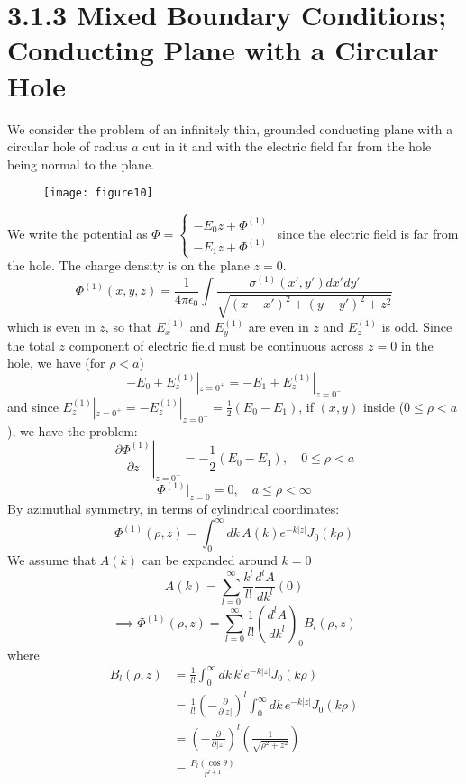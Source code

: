 \documentclass{article}
\begin{document}
	\section*{3.1.3 Mixed Boundary Conditions; Conducting Plane with a Circular Hole}
	
	We consider the problem of an infinitely thin, grounded conducting plane with a circular hole of radius $a$ cut in it and with the electric field far from the hole being normal to the plane.
	
	\begin{figure}[h]
		\centering
		\texttt{[image: figure10]}
		\caption{}
		\label{fig:figure10}
	\end{figure}
	
	We write the potential as $\Phi = \begin{cases} -E_0 z + \Phi^{(1)} \\ -E_1 z + \Phi^{(1)} \end{cases}$ since the electric field is far from the hole. The charge density is on the plane $z=0$.
	\[
	\Phi^{(1)}(x,y,z) = \frac{1}{4\pi\epsilon_0} \int \frac{\sigma^{(1)}(x',y')dx'dy'}{\sqrt{(x-x')^2 + (y-y')^2+z^2}}
	\]
	which is even in $z$, so that $E_x^{(1)}$ and $E_y^{(1)}$ are even in $z$ and $E_z^{(1)}$ is odd. Since the total $z$ component of electric field must be continuous across $z=0$ in the hole, we have (for $\rho<a$)
	\[
	-E_0 + E_z^{(1)}|_{z=0^+} = -E_1 + E_z^{(1)}|_{z=0^-}
	\]
	and since $E_z^{(1)}|_{z=0^+} = -E_z^{(1)}|_{z=0^-} = \frac{1}{2}(E_0-E_1)$, if $(x,y)$ inside ($0\le\rho<a$), we have the problem:
	\[
	\left. \frac{\partial \Phi^{(1)}}{\partial z} \right|_{z=0^+} = -\frac{1}{2}(E_0-E_1), \quad 0 \le \rho < a
	\]
	\[
	\Phi^{(1)}|_{z=0} = 0, \quad a \le \rho < \infty
	\]
	By azimuthal symmetry, in terms of cylindrical coordinates:
	\[
	\Phi^{(1)}(\rho,z) = \int_0^\infty dk \, A(k) e^{-k|z|} J_0(k\rho)
	\]
	We assume that $A(k)$ can be expanded around $k=0$
	\[
	A(k) = \sum_{l=0}^\infty \frac{k^l}{l!} \frac{d^l A}{dk^l}(0)
	\]
	\[
	\implies \Phi^{(1)}(\rho,z) = \sum_{l=0}^\infty \frac{1}{l!} \left(\frac{d^l A}{dk^l}\right)_0 B_l(\rho,z)
	\]
	where
	\begin{align*}
		B_l(\rho,z) &= \frac{1}{l!} \int_0^\infty dk \, k^l e^{-k|z|} J_0(k\rho) \\
		&= \frac{1}{l!} \left(-\frac{\partial}{\partial |z|}\right)^l \int_0^\infty dk \, e^{-k|z|} J_0(k\rho) \\
		&= \left(-\frac{\partial}{\partial |z|}\right)^l \left( \frac{1}{\sqrt{\rho^2+z^2}} \right) \\
		&= \frac{P_l(\cos\theta)}{r^{l+1}}
	\end{align*}
\end{document}

